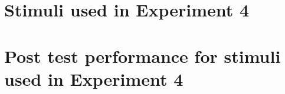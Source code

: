 \documentclass{../Dissertate}
\begin{document}
\begin{appendices}
  \chapter{Stimuli used in Experiment 4}\label{appendix:exp4_stimuli}
  

  \chapter{Post test performance for stimuli used in Experiment 4} \label{appendix:exp4_posttest}
  
\end{appendices}


\end{document}
